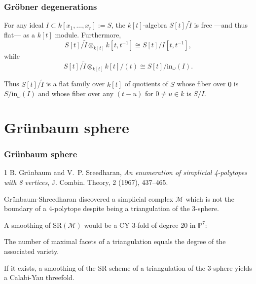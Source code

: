 \documentclass{beamer}
\begin{document}
\begin{frame}%
\frametitle{Gröbner degenerations}

\begin{theorem}
\label{theorem-grobner-flat-morphism}
For any ideal $I \subset k[x_1,\ldots,x_r]:=S$, the
$k[t]$-algebra $S[t]/\tilde{I}$ is free ---and thus flat---
as a $k[t]$ module. Furthermore,
$$
S[t]/\tilde{I}\otimes_{k[t]}k[t,t^{-1}]
\cong S[t]/I[t,t^{-1}],
$$
while
$$
S[t]/\tilde{I}\otimes_{k[t]}k[t]/(t)
\cong S[t]/\text{in}_{\omega}(I).
$$

Thus $S[t]/\tilde{I}$ is a flat family over $k[t]$ of quotients
of $S$ whose fiber over $0$ is $S/\text{in}_\omega(I)$ and
whose fiber over any $(t-u)$ for $0 \neq u \in k$ is $S/I$.
\end{theorem}


\end{frame}

\section{Grünbaum sphere}

\begin{frame}%
\frametitle{Grünbaum sphere}

{\footnotesize
\begin{thebibliography}{1}
B. Grünbaum and V.~P. Sreedharan,
\emph{An enumeration of simplicial 4-polytopes with 8 vertices},
J. Combin. Theory, 2 (1967), 437–465.
\end{thebibliography}
}

\medskip\noindent
Grünbaum-Shreedharan discovered a simplicial complex $\mathcal{M}$ 
which is not the boundary of a 4-polytope
despite being a triangulation of the 3-sphere.

\pause\medskip\noindent
A smoothing of $\text{SR}(\mathcal{M})$ would
be a CY 3-fold of degree 20 in $\mathbb{P}^7$:
\begin{lemma}
\label{lemma-degree}
The number of maximal facets of a triangulation equals the
degree of the associated variety.
\end{lemma}

\begin{theorem}
\label{theorem-smoothing-triangulation}
If it exists, a smoothing of the SR scheme of a 
triangulation of the 3-sphere yields a Calabi-Yau threefold.
\end{theorem}

\noindent
\end{frame}
\end{document}
